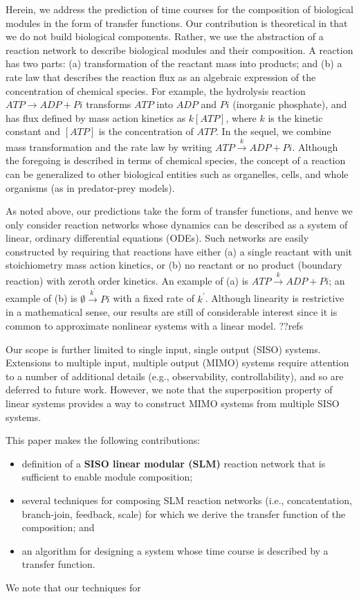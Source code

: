 \documentclass[unnumsec,webpdf,contemporary,large]{oup-authoring-template}%
\theoremstyle{thmstyleone}%
\theoremstyle{thmstyletwo}%
\theoremstyle{thmstylethree}%
\begin{document}
\begin{enumerate}
Herein, we address the prediction of time courses for
the composition of biological modules in the form of transfer functions.
Our contribution is theoretical in that we do not build biological components.
Rather, we use the abstraction of a reaction network to
describe biological modules and their composition.
A reaction has two parts: (a) transformation of the reactant mass
into products;
and (b)
a rate law that
describes the reaction flux
as an algebraic expression of the concentration of chemical species.
For example, the hydrolysis reaction $ATP \rightarrow ADP + Pi$
transforms $ATP$ into $ADP$ and $Pi$ (inorganic phosphate),
and has flux defined by mass action kinetics as
$k [ATP]$, where $k$ is the kinetic constant
and $[ATP]$ is the concentration of $ATP$.
In the sequel, we combine mass transformation and the rate law by
writing $ATP \xrightarrow{k} ADP + Pi$.
Although the foregoing is described in terms of
chemical species, the concept of
a reaction can be
generalized to other biological entities such as
organelles, cells, and whole organisms (as in predator-prey models).

As noted above, our predictions take the form of transfer functions,
and henve
we only consider
reaction networks whose dynamics can be described
as a system of linear, ordinary differential equations (ODEs).
Such networks are easily constructed by requiring that reactions have either
(a) a single reactant with unit stoichiometry mass action kinetics,
or (b) no reactant or no product (boundary reaction) with zeroth order kinetics.
An example of (a) is $ATP \xrightarrow{k} ADP + Pi$;
an example of (b) is $\emptyset \xrightarrow{k^{\prime}} Pi$ with
a fixed rate of $k^{\prime}$.
Although linearity is restrictive in a mathematical sense, our results are
still of considerable interest since it is common to approximate
nonlinear systems with a linear model. ??refs

Our scope is further limited to
single input, single output (SISO)
systems.
Extensions to multiple input, multiple output (MIMO) systems require attention to a
number of additional details (e.g., observability, controllability),
and so are deferred to future work.
However, we note that the superposition property of linear systems
provides a way to construct
MIMO systems
from
multiple SISO systems.


This paper makes the following contributions:
\begin{itemize}
\item
definition of a {\bf SISO linear modular (SLM)} reaction network
that is sufficient to enable module composition;
\item
several techniques for composing SLM reaction networks (i.e., concatentation,
branch-join, feedback, scale) for which we derive the transfer
function of the composition; and
\item
an algorithm for designing a system whose time course is described
by a transfer function.
\end{itemize}
We note that our techniques for 


\end{enumerate}
\end{document}
